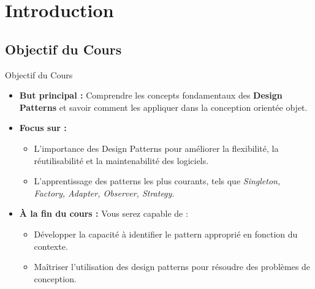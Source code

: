 \documentclass[aspectratio=169]{beamer}
\begin{document}
\section{Introduction}
    \subsection{Objectif du Cours}
        \begin{frame}{Objectif du Cours}
            \begin{itemize}
                \item<1-> \textbf{But principal :} Comprendre les concepts fondamentaux des \textbf{Design Patterns} et savoir comment les appliquer dans la conception orientée objet.
                \item<2-> \textbf{Focus sur :} 
                \begin{itemize}
                    \item L'importance des Design Patterns pour améliorer la flexibilité, la réutilisabilité et la maintenabilité des logiciels.
                    \item L'apprentissage des patterns les plus courants, tels que \textit{Singleton, Factory, Adapter, Observer, Strategy}.
                \end{itemize}                
                \item<3-> \textbf{À la fin du cours :} Vous serez capable de :
                \begin{itemize}
                    \item Développer la capacité à identifier le pattern approprié en fonction du contexte.
                    \item Maîtriser l'utilisation des design patterns pour résoudre des problèmes de conception.                    
                \end{itemize}
            \end{itemize}
        \end{frame}
\end{document}
